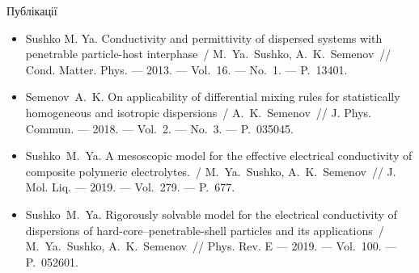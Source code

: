\documentclass[10pt]{beamer}
\begin{document}
\begin{frame}{Публікації}
\footnotesize
  \begin{itemize}
    \item
    Sushko M. Ya. Conductivity and permittivity of dispersed systems 
    with penetrable particle-host interphase~/ M.~Ya.~Sushko, 
    A.~K.~Semenov~// Cond. Matter. Phys. --- 2013. --- Vol.~16. --- No.~1. 
    --- P.~13401.
    
    \item
    Semenov~A.~K. On applicability of differential mixing rules for
      statistically homogeneous and isotropic dispersions~/ A.~K.~Semenov~//
      J. Phys. Commun. --- 2018. --- Vol.~2. --- No.~3. --- P.~035045.
    
    \item
    Sushko~M.~Ya. A mesoscopic model for the effective electrical 
    conductivity of composite polymeric electrolytes.~/ M.~Ya.~Sushko,
    A.~K.~Semenov~// J. Mol. Liq. --- 2019. --- Vol.~279. --- P.~677. 
    
    \item
    Sushko~M.~Ya. Rigorously solvable model for the electrical conductivity of dispersions of hard-core--penetrable-shell particles and its applications~/
    M.~Ya.~Su\-shko, A.~K.~Semenov~//
    Phys. Rev. E --- 2019. --- Vol.~100. --- P.~052601.
  \end{itemize}

\end{frame}
\end{document}
